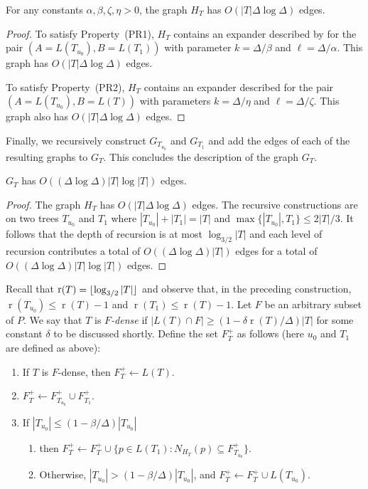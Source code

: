 \documentclass{patmorin}
\DeclareMathOperator{\rank}{r}
\begin{document}
\begin{clm}
  For any constants $\alpha,\beta,\zeta,\eta>0$, the graph $H_T$ has
  $O(|T|\Delta\log\Delta)$ edges.
\end{clm}

\begin{proof}
  To satisfy Property~(PR1), $H_T$ contains an expander described
  by  for the pair $(A=L(T_{u_0}),B=L(T_1))$ with
  parameter $k=\Delta/\beta$ and $\ell=\Delta/\alpha$.  This graph has
  $O(|T|\Delta\log\Delta)$ edges.

  To satisfy Property~(PR2), $H_T$ contains an expander described
   for the pair $(A=L(T_{u_0}),B=L(T))$ with
  parameters $k=\Delta/\eta$ and $\ell=\Delta/\zeta$. This graph also
  has $O(|T|\Delta\log\Delta)$ edges.
\end{proof}

Finally, we recursively construct $G_{T_{u_0}}$ and $G_{T_1}$ and add the
edges of each of the resulting graphs to $G_{T}$. This concludes the description of the graph $G_T$.

\begin{clm}
  $G_{T}$ has $O((\Delta\log\Delta)|T|\log |T|)$ edges.
\end{clm}

\begin{proof}
  The graph $H_T$ has
  $O(|T|\Delta\log\Delta)$ edges.  The recursive constructions are on two trees $T_{u_0}$
  and $T_1$ where $|T_{u_0}|+|T_1|=|T|$ and $\max\{|T_{u_0}|,T_1\}\le
  2|T|/3$. It follows that the depth of recursion is at most
  $\log_{3/2}|T|$ and each level of recursion contributes a total of
  $O((\Delta\log\Delta)|T|)$ edges for a total of $O((\Delta\log\Delta)|T|\log|T|)$ edges.
\end{proof}

Recall that $\rank(T)=\floor{\log_{3/2} |T|}$ and observe that, in
the preceding construction, $\rank(T_{u_0}) \le \rank(T)-1$ and
$\rank(T_1)\le\rank(T)-1$.  Let $F$ be an arbitrary subset of $P$.  We say
that $T$ is \emph{$F$-dense} if $|L(T)\cap F|\ge (1-\delta\rank(T)/\Delta)|T|$
for some constant $\delta$ to be discussed shortly.  Define the set
$F^+_T$ as follows (here $u_0$ and $T_1$ are defined as above):

\begin{enumerate}
  \item If $T$ is $F$-dense, then $F^+_T\gets L(T)$.
  \item $F^+_T\gets F^+_{T_{u_0}}\cup F^+_{T_1}$.
  \item If $|T_{u_0}|\le (1-\beta/\Delta)|T_{u_0}|$
  \begin{enumerate}
     \item then $F^+_T\gets F^+_T\cup\{p\in L(T_1): N_{H_T}(p)\subseteq
     F^+_{T_{u_0}}\}$.
     \item Otherwise, $|T_{u_0}|> (1-\beta/\Delta)|T_{u_0}|$, and $F^+_T\gets F^+_T\cup L(T_{u_0})$.
  \end{enumerate}
\end{enumerate}
\end{document}
